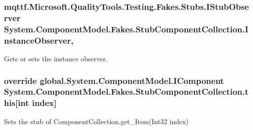 \hypertarget{class_system_1_1_component_model_1_1_fakes_1_1_stub_component_collection_a6a77419b8d6f982a71ec8484cbc42792}{
\subsubsection[{Instance\-Observer}]{\setlength{\rightskip}{0pt plus 5cm}mqttf.\-Microsoft.\-Quality\-Tools.\-Testing.\-Fakes.\-Stubs.\-I\-Stub\-Observer System.\-Component\-Model.\-Fakes.\-Stub\-Component\-Collection.\-Instance\-Observer\hspace{0.3cm}{\ttfamily [get]}, {\ttfamily [set]}}}\label{class_system_1_1_component_model_1_1_fakes_1_1_stub_component_collection_a6a77419b8d6f982a71ec8484cbc42792}


Gets or sets the instance observer.

\hypertarget{class_system_1_1_component_model_1_1_fakes_1_1_stub_component_collection_a6afffe2226272c520036f21ff239c55f}{
\subsubsection[{this[int index]}]{\setlength{\rightskip}{0pt plus 5cm}override global.\-System.\-Component\-Model.\-I\-Component System.\-Component\-Model.\-Fakes.\-Stub\-Component\-Collection.\-this\mbox{[}int {\bf index}\mbox{]}\hspace{0.3cm}{\ttfamily [get]}}}\label{class_system_1_1_component_model_1_1_fakes_1_1_stub_component_collection_a6afffe2226272c520036f21ff239c55f}


Sets the stub of Component\-Collection.\-get\-\_\-\-Item(\-Int32 index)


